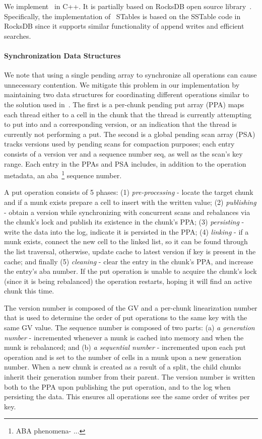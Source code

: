 We implement \sys\ in C++. It is partially based on RocksDB open source library~\cite{rocksdb}.
Specifically, the implementation of \sys\ STables is based on the SSTable code in RocksDB since it supports similar functionality of append writes and efficient searches. 

\paragraph{Synchronization Data Structures}
We note that using a single pending array to synchronize all
operations can cause unnecessary contention.
We mitigate this problem in our implementation by maintaining two data structures for coordinating different operations similar to the solution used in~\cite{kiwi}. The first is a per-chunk pending put array (PPA) maps each thread either to a cell in the chunk that the thread is currently attempting to put into and a corresponding version, or an indication that the thread is currently not performing a put. The second is a global pending scan array (PSA) tracks versions used by pending scans for compaction purposes; each entry consists of a version ver and a sequence number seq, as well as the scan’s key range. Each entry in the PPAs and PSA includes, in addition to the operation metadata, an aba~\footnote{ABA phenomena- ...} sequence number. 

A put operation consists of 5 phases: (1) \emph{pre-processing} - locate the target chunk and if a munk exists prepare a cell to insert with the written value; (2) \emph{publishing} - obtain a version while synchronizing with concurrent scans and rebalances via the chunk's lock and publish its existence in the chunk's PPA; (3) \emph{persisting} - write the data into the log, indicate it is persisted in the PPA; (4) \emph{linking} - if a munk exists, connect the new cell to the linked list, so it can be found through the list traversal, otherwise, update cache to latest version if key is present in the cache; and finally (5) \emph{cleaning} - clear the entry in the chunk's PPA, and increase the entry's aba number.
If the put operation is unable to acquire the chunk's lock (since it is being rebalanced) the operation restarts, hoping it will find an active chunk this time.

The version number is composed of the GV and a per-chunk linearization number that is used to determine the order of put operations to the same key with the same GV value.  The sequence number is composed of two parts: (a) \emph{a generation number} - incremented whenever a munk is cached into memory and when the munk is rebalanced; and (b) \emph{a sequential number} - incremented upon each put operation and is set to the number of cells in a munk upon a new generation number. When a new chunk is created as a result of a split, the child chunks inherit their generation number from their parent. The version number is written both to the PPA upon publishing the put operation, and to the log when persisting the data. This ensures all operations see the same order of writes per key.


